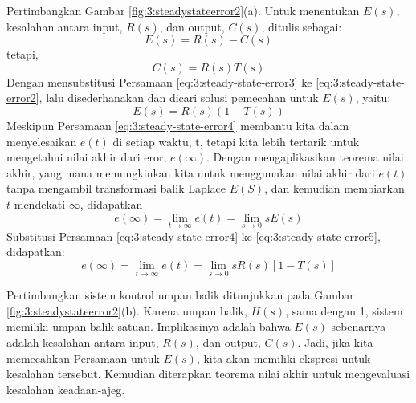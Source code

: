 Pertimbangkan Gambar \ref{fig:3:steadystateerror2}(a). Untuk menentukan $E(s)$, kesalahan antara input, $R(s)$, dan output, $C(s)$, ditulis sebagai:
\begin{equation} \label{eq:3:steady-state-error2}
E(s) = R(s) - C(s)
\end{equation}
tetapi,
\begin{equation} \label{eq:3:steady-state-error3}
C(s) = R(s)T(s)
\end{equation}
Dengan mensubstitusi Persamaan \ref{eq:3:steady-state-error3} ke \ref{eq:3:steady-state-error2}, lalu disederhanakan dan dicari solusi pemecahan untuk $E(s)$, yaitu:
\begin{equation} \label{eq:3:steady-state-error4}
E(s) = R(s)(1 - T(s))
\end{equation}
Meskipun Persamaan \ref{eq:3:steady-state-error4} membantu kita dalam menyelesaikan $e(t)$ di setiap waktu, t, tetapi kita lebih tertarik untuk mengetahui nilai akhir dari eror, $e(\infty)$. Dengan mengaplikasikan teorema nilai akhir, yang mana memungkinkan kita untuk menggunakan nilai akhir dari $e(t)$ tanpa mengambil transformasi balik Laplace $E(S)$, dan kemudian membiarkan $t$ mendekati $\infty$, didapatkan
\begin{equation} \label{eq:3:steady-state-error5}
e(\infty) = \lim_{t \to \infty} e(t) = \lim_{s \to 0} sE(s)
\end{equation}
Substitusi Persamaan \ref{eq:3:steady-state-error4} ke \ref{eq:3:steady-state-error5}, didapatkan:
\begin{equation} \label{eq:3:final-steady-state-error}
e(\infty) = \lim_{t \to \infty} e(t) = \lim_{s \to 0} sR(s)[1 - T(s)]
\end{equation}

Pertimbangkan sistem kontrol umpan balik ditunjukkan pada Gambar \ref{fig:3:steadystateerror2}(b). Karena umpan balik, $H(s)$, sama dengan 1, sistem memiliki umpan balik satuan. Implikasinya adalah bahwa $E(s)$ sebenarnya adalah kesalahan antara input, $R(s)$, dan output, $C(s)$. Jadi, jika kita memecahkan Persamaan untuk $E(s)$, kita akan memiliki ekspresi untuk kesalahan tersebut. Kemudian diterapkan teorema nilai akhir untuk mengevaluasi kesalahan keadaan-ajeg.


